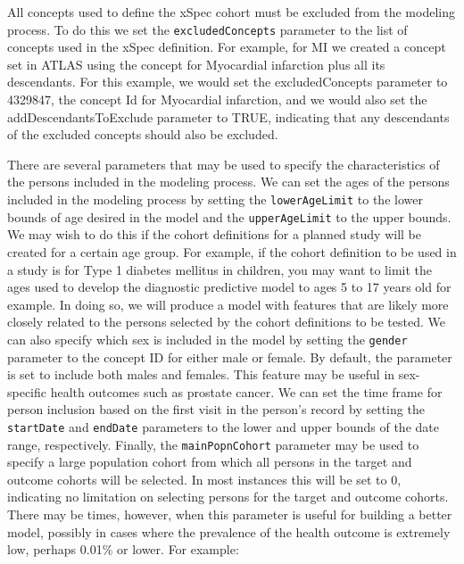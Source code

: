 \documentclass[11pt]{book}
\theoremstyle{definition}
\theoremstyle{definition}
\theoremstyle{definition}
\theoremstyle{remark}
\begin{document}
All concepts used to define the xSpec cohort must be excluded from the
modeling process. To do this we set the \texttt{excludedConcepts}
parameter to the list of concepts used in the xSpec definition. For
example, for MI we created a concept set in ATLAS using the concept for
Myocardial infarction plus all its descendants. For this example, we
would set the excludedConcepts parameter to 4329847, the concept Id for
Myocardial infarction, and we would also set the addDescendantsToExclude
parameter to TRUE, indicating that any descendants of the excluded
concepts should also be excluded.

There are several parameters that may be used to specify the
characteristics of the persons included in the modeling process. We can
set the ages of the persons included in the modeling process by setting
the \texttt{lowerAgeLimit} to the lower bounds of age desired in the
model and the \texttt{upperAgeLimit} to the upper bounds. We may wish to
do this if the cohort definitions for a planned study will be created
for a certain age group. For example, if the cohort definition to be
used in a study is for Type 1 diabetes mellitus in children, you may
want to limit the ages used to develop the diagnostic predictive model
to ages 5 to 17 years old for example. In doing so, we will produce a
model with features that are likely more closely related to the persons
selected by the cohort definitions to be tested. We can also specify
which sex is included in the model by setting the \texttt{gender}
parameter to the concept ID for either male or female. By default, the
parameter is set to include both males and females. This feature may be
useful in sex-specific health outcomes such as prostate cancer. We can
set the time frame for person inclusion based on the first visit in the
person's record by setting the \texttt{startDate} and \texttt{endDate}
parameters to the lower and upper bounds of the date range,
respectively. Finally, the \texttt{mainPopnCohort} parameter may be used
to specify a large population cohort from which all persons in the
target and outcome cohorts will be selected. In most instances this will
be set to 0, indicating no limitation on selecting persons for the
target and outcome cohorts. There may be times, however, when this
parameter is useful for building a better model, possibly in cases where
the prevalence of the health outcome is extremely low, perhaps 0.01\% or
lower. For example:
\end{document}
